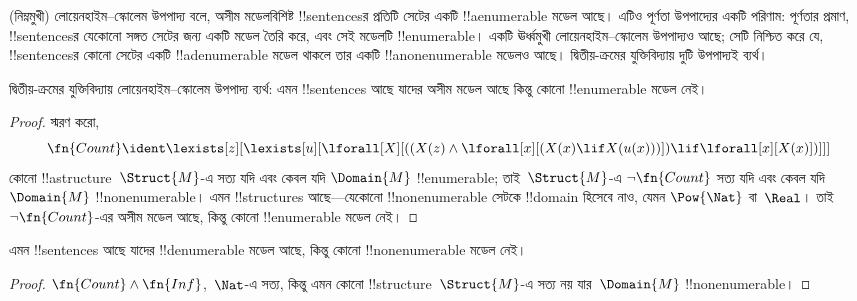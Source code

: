 \documentclass[../../../include/open-logic-section]{subfiles}
\begin{document}


\begin{explain}
(নিম্নমুখী) লোয়েনহাইম--স্কোলেম উপপাদ্য বলে, অসীম মডেলবিশিষ্ট
!!{sentence}sর প্রতিটি সেটের একটি !!a{enumerable} মডেল আছে। এটিও
পূর্ণতা উপপাদ্যের একটি পরিণাম: পূর্ণতার প্রমাণ, !!{sentence}sর যেকোনো
সঙ্গত সেটের জন্য একটি মডেল তৈরি করে, এবং সেই মডেলটি !!{enumerable}।
একটি ঊর্ধ্বমুখী লোয়েনহাইম--স্কোলেম উপপাদ্যও আছে; সেটি নিশ্চিত করে যে,
!!{sentence}sর কোনো সেটের একটি !!a{denumerable} মডেল থাকলে তার একটি
!!a{nonenumerable} মডেলও আছে। দ্বিতীয়-ক্রমের যুক্তিবিদ্যায় দুটি
উপপাদ্যই ব্যর্থ।
\end{explain}


\begin{thm}
 দ্বিতীয়-ক্রমের যুক্তিবিদ্যায়
লোয়েনহাইম--স্কোলেম উপপাদ্য ব্যর্থ: এমন !!{sentence}s আছে যাদের অসীম
মডেল আছে কিন্তু কোনো !!{enumerable} মডেল নেই।
\end{thm}

\begin{proof}
স্মরণ করো,
\[
\fn{Count} \ident \lexists[z][\lexists[u][\lforall[X][((X(z) \land
      \lforall[x][(X(x) \lif X(u(x)))]) \lif \lforall[x][X(x)])]]]
\]
কোনো !!a{structure}~$\Struct{M}$-এ সত্য যদি এবং কেবল যদি
$\Domain{M}$ !!{enumerable}; তাই~$\Struct{M}$-এ $\lnot\fn{Count}$ সত্য
যদি এবং কেবল যদি $\Domain{M}$ !!{nonenumerable}। এমন !!{structure}s
আছে—যেকোনো !!{nonenumerable} সেটকে !!{domain} হিসেবে নাও, যেমন
$\Pow{\Nat}$ বা~$\Real$। তাই $\lnot \fn{Count}$-এর অসীম মডেল আছে,
কিন্তু কোনো !!{enumerable} মডেল নেই।
\end{proof}

\begin{thm}
এমন !!{sentence}s আছে যাদের !!{denumerable} মডেল আছে, কিন্তু কোনো
!!{nonenumerable} মডেল নেই।
\end{thm}

\begin{proof}
$\fn{Count} \land \fn{Inf}$,~$\Nat$-এ সত্য, কিন্তু এমন কোনো
!!{structure}~$\Struct{M}$-এ সত্য নয় যার~$\Domain{M}$
!!{nonenumerable}।
\end{proof}
\end{document}

